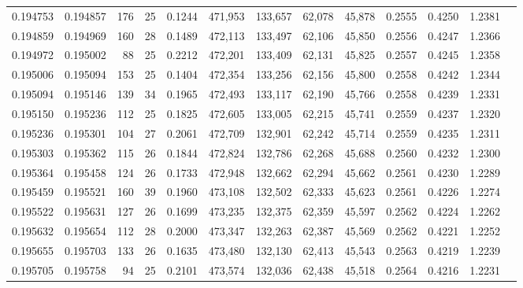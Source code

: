 \begin{tabular}{rrrrrrrrrrrrr}
0.194753 & 0.194857 & 176 &  25 &                                     0.1244 & 471,953 & 133,657 &  62,078 &  45,878 & 0.2555 & 0.4250 & 1.2381 \\
0.194859 & 0.194969 & 160 &  28 &                                     0.1489 & 472,113 & 133,497 &  62,106 &  45,850 & 0.2556 & 0.4247 & 1.2366 \\
0.194972 & 0.195002 &  88 &  25 &                                     0.2212 & 472,201 & 133,409 &  62,131 &  45,825 & 0.2557 & 0.4245 & 1.2358 \\
0.195006 & 0.195094 & 153 &  25 &                                     0.1404 & 472,354 & 133,256 &  62,156 &  45,800 & 0.2558 & 0.4242 & 1.2344 \\
0.195094 & 0.195146 & 139 &  34 &                                     0.1965 & 472,493 & 133,117 &  62,190 &  45,766 & 0.2558 & 0.4239 & 1.2331 \\
0.195150 & 0.195236 & 112 &  25 &                                     0.1825 & 472,605 & 133,005 &  62,215 &  45,741 & 0.2559 & 0.4237 & 1.2320 \\
0.195236 & 0.195301 & 104 &  27 &                                     0.2061 & 472,709 & 132,901 &  62,242 &  45,714 & 0.2559 & 0.4235 & 1.2311 \\
0.195303 & 0.195362 & 115 &  26 &                                     0.1844 & 472,824 & 132,786 &  62,268 &  45,688 & 0.2560 & 0.4232 & 1.2300 \\
0.195364 & 0.195458 & 124 &  26 &                                     0.1733 & 472,948 & 132,662 &  62,294 &  45,662 & 0.2561 & 0.4230 & 1.2289 \\
0.195459 & 0.195521 & 160 &  39 &                                     0.1960 & 473,108 & 132,502 &  62,333 &  45,623 & 0.2561 & 0.4226 & 1.2274 \\
0.195522 & 0.195631 & 127 &  26 &                                     0.1699 & 473,235 & 132,375 &  62,359 &  45,597 & 0.2562 & 0.4224 & 1.2262 \\
0.195632 & 0.195654 & 112 &  28 &                                     0.2000 & 473,347 & 132,263 &  62,387 &  45,569 & 0.2562 & 0.4221 & 1.2252 \\
0.195655 & 0.195703 & 133 &  26 &                                     0.1635 & 473,480 & 132,130 &  62,413 &  45,543 & 0.2563 & 0.4219 & 1.2239 \\
0.195705 & 0.195758 &  94 &  25 &                                     0.2101 & 473,574 & 132,036 &  62,438 &  45,518 & 0.2564 & 0.4216 & 1.2231 \\

\end{tabular}
